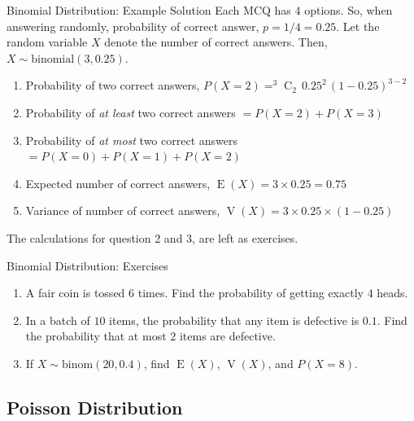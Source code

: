 \documentclass[12pt, aspectratio=169]{beamer}
\DeclareMathOperator{\E}{E}
\DeclareMathOperator{\V}{V}
\DeclareMathOperator{\C}{C}
\begin{document}
	\begin{frame}{Binomial Distribution: Example Solution}
		Each MCQ has $4$ options. So, when answering randomly, probability of correct answer, $p = 1/4 = 0.25$.
		Let the random variable $X$ denote the number of correct answers. Then, \(X \sim \mathrm{binomial}(3, 0.25)\).

		\begin{enumerate}
			\item Probability of two correct answers, \(P(X=2) = ^3\C_2 \, 0.25^2 \, (1-0.25)^{3-2}\)
			\item Probability of \emph{at least} two correct answers \(=P(X=2) + P(X=3)\)
			\item Probability of \emph{at most} two correct answers \(=P(X=0) + P(X=1) + P(X=2)\)
			\item Expected number of correct answers, \(\E(X) = 3 \times 0.25 = 0.75\)
			\item Variance of number of correct answers, \(\V(X) = 3 \times 0.25 \times (1-0.25)\)
		\end{enumerate}

		The calculations for question 2 and 3, are left as exercises.
	\end{frame}


	\begin{frame}{Binomial Distribution: Exercises}
		\begin{enumerate}
			\item A fair coin is tossed \(6\) times. Find the probability of getting exactly \(4\) heads.
			\item In a batch of \(10\) items, the probability that any item is defective is \(0.1\). Find the probability that at most \(2\) items are defective.
			\item If \(X \sim \mathrm{binom}(20, 0.4)\), find \(\E(X)\), \(\V(X)\), and \(P(X=8)\).
		\end{enumerate}
	\end{frame}


	\subsection{Poisson Distribution}
\end{document}
